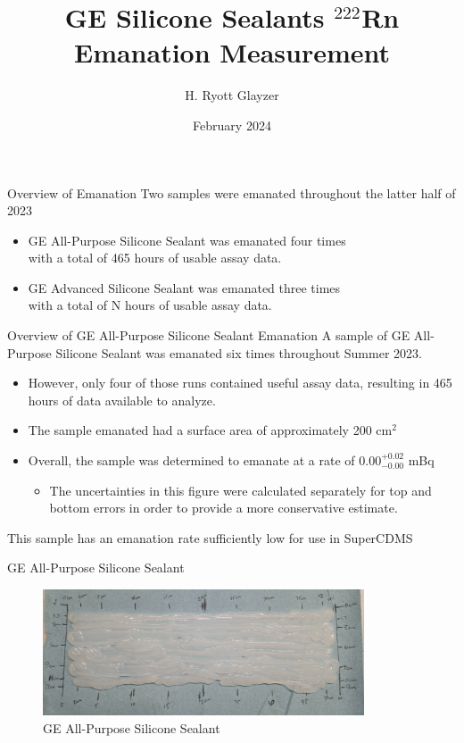 \documentclass[aspectratio=169]{beamer}
\title{GE Silicone Sealants $^{222}$Rn Emanation Measurement}
\author[H. R. Glayzer]{H. Ryott Glayzer}
\institute[SDSMT]
{Lab Assistant\\
    SD Mines}
\date[2024]{February 2024}
\begin{document}
\frame{\titlepage}

\begin{frame}{Overview of Emanation}
    Two samples were emanated throughout the latter half of 2023
    \begin{itemize}
        \item GE All-Purpose Silicone Sealant was emanated four times\\
            with a total of 465 hours of usable assay data.
        \item GE Advanced Silicone Sealant was emanated three times\\
            with a total of N hours of usable assay data.
    \end{itemize}
\end{frame}

\begin{frame}{Overview of GE All-Purpose Silicone Sealant Emanation}
    A sample of GE All-Purpose Silicone Sealant was emanated six times throughout Summer 2023.
        \begin{itemize}
            \item However, only four of those runs contained useful assay data,\@
                resulting in 465 hours of data available to analyze.
            \item The sample emanated had a surface area of approximately 200 cm$^{2}$
            \item Overall, the sample was determined to emanate at a rate of 0.00$^{+0.02}_{-0.00}$ mBq
            \begin{itemize}
                \item The uncertainties in this figure were calculated separately for top\@
                    and bottom errors in order to provide a more conservative estimate.
            \end{itemize}
        \end{itemize}
    This sample has an emanation rate sufficiently low for use in SuperCDMS
\end{frame}

\begin{frame}{GE All-Purpose Silicone Sealant}
    \begin{figure}
         \centering
        \includegraphics[width=0.85\textwidth]{assets/all-purpose-sample.png}
        \caption{GE All-Purpose Silicone Sealant}
    \end{figure}
\end{frame}
\end{document}

